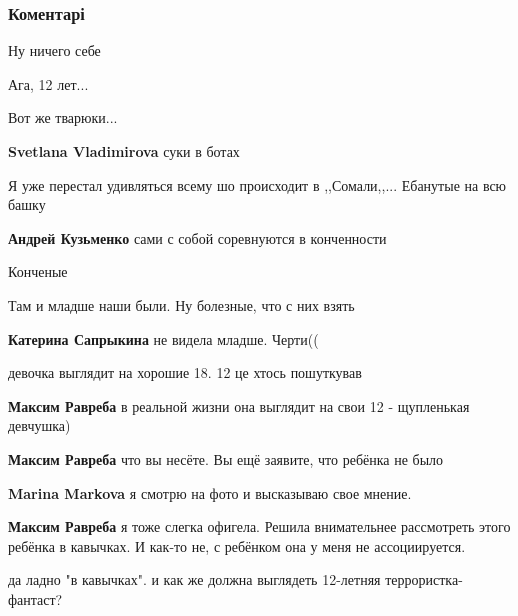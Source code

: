  
 
 
 
 
\subsubsection{Коментарі}

\begin{itemize} %
Ну ничего себе

Ага, 12 лет...

Вот же тварюки...

\textbf{Svetlana Vladimirova} суки в ботах

Я уже перестал удивляться всему шо происходит в ,,Сомали,,... Ебанутые на всю башку

\textbf{Андрей Кузьменко} сами с собой соревнуются в конченности

Конченые

Там и младше наши были. Ну болезные, что с них взять

\textbf{Катерина Сапрыкина} не видела младше. Черти((

девочка выглядит на хорошие 18. 12 це хтось пошуткував

\begin{itemize} %
\textbf{Максим Равреба} в реальной жизни она выглядит на свои 12 - щупленькая девчушка)

\textbf{Максим Равреба} что вы несёте. Вы ещё заявите, что ребёнка не было

\textbf{Marina Markova} я смотрю на фото и высказываю свое мнение.

\textbf{Максим Равреба} я тоже слегка офигела. Решила внимательнее рассмотреть этого ребёнка в кавычках. И как-то не, с ребёнком она у меня не ассоциируется.


да ладно "в кавычках". и как же должна выглядеть 12-летняя террористка-фантаст?


\end{itemize}
\end{itemize}
